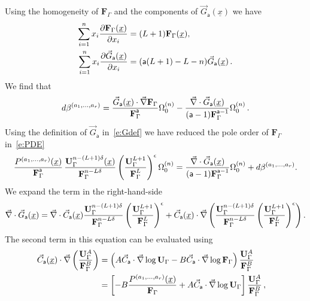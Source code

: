 \documentclass[a4paper,12pt]{article}
\numberwithin{equation}{section}
\numberwithin{figure}{section}
\begin{document}
Using the homogeneity of $\mathbf{F}_\Gamma$ and the
components of $\vec G_{\mathsf{a}}(\underline x)$ we have
\begin{align}
  \sum_{i=1}^n x_i {\partial\mathbf{F}_\Gamma (\underline x)\over \partial x_i}&=
                                                                  (L+1) \mathbf{F}_\Gamma (\underline x),\\
   \sum_{i=1}^n x_i {\partial\vec G_{\mathsf{a}}(\underline x)\over \partial x_i}&=
                                                                  (\mathsf{a}(L+1)-L-n) \vec G_{\mathsf{a}}(\underline x) \,.
\end{align}
We find that 
   \begin{equation}
     d\beta^{(a_1,\dots,a_r)}= {  \vec  G_{\mathsf{a}}
     (\underline x)
\cdot    \vec \nabla\textbf{F}_\Gamma\over
     \textbf{F}_\Gamma^{\mathsf{a}}}\Omega_0^{(n)}-{
\vec\nabla \cdot \vec G_{\mathsf{a}}
     (\underline x)
    \over
    (\mathsf{a}-1)\textbf{F}_\Gamma^{\mathsf{a}-1}}
  \Omega_0^{(n)} \,.
\end{equation}
Using the definition of $\vec  G_{\mathsf{a}}$ in~\eqref{e:Gdef} we
have reduced the pole order  of $ \textbf{F}_\Gamma$ in~\eqref{e:PDE} 
\begin{equation}
  {  P^{(a_1,\dots,a_r)}(\underline x)\over \textbf{F}_\Gamma^{\mathsf{a}}}\, { \textbf{U}_\Gamma^{n-(L+1)\delta} (\underline x)\over \textbf{F}_\Gamma^{n-L\delta}}
  \left(\textbf{U}_\Gamma^{L+1}\over \textbf{F}_\Gamma^L\right)^{\epsilon} \Omega^{(n)}_0={
\vec\nabla \cdot \vec G_{\mathsf{a}}
     (\underline x)
    \over
    (\mathsf{a}-1)\textbf{F}_\Gamma^{\mathsf{a}-1}}
  \Omega_0^{(n)}+d\beta^{(a_1,\dots,a_r)}.
\end{equation}
We expand the term in the right-hand-side
\begin{multline}
  \vec\nabla \cdot \vec G_{\mathsf{a}}(\underline x)=  \vec\nabla \cdot \vec C_{\mathsf{a}}(\underline x) {\textbf{U}_\Gamma^{n-(L+1)\delta}\over
  \textbf{F}_\Gamma^{n-L\delta}} \left(\mathbf{U}_\Gamma^{L+1}\over
  \mathbf{F}_\Gamma^L\right)^\epsilon
+
  \vec C_{\mathsf{a}}(\underline x) \cdot\vec\nabla  \left(  {\textbf{U}_\Gamma^{n-(L+1)\delta}\over
  \textbf{F}_\Gamma^{n-L\delta}} \left(\mathbf{U}_\Gamma^{L+1}\over
  \mathbf{F}_\Gamma^L\right)^\epsilon\right) .
\end{multline}
%
The second term in this equation can be evaluated using
\begin{align}
  \vec C_{\mathsf{a}}(\underline x)\cdot \vec\nabla \left(\mathbf{U}_\Gamma^{A}\over
\mathbf{F}_\Gamma^B\right)&=\left(A \vec
C_{\mathsf{a}}\cdot \vec\nabla \log\mathbf{U}_\Gamma -B \vec
C_{\mathsf{a}}\cdot \vec\nabla \log \mathbf{F}_\Gamma\right) {\mathbf{U}_\Gamma^{A}\over
\mathbf{F}_\Gamma^B} \cr
&=\left[-B{
    P^{(a_1,\dots,a_r)}(\underline x)\over
  \mathbf{F}_\Gamma}   
+
 A \vec
C_{\mathsf{a}}\cdot \vec\nabla \log\mathbf{U}_\Gamma \right] {\mathbf{U}_\Gamma^{A}\over
	\mathbf{F}_\Gamma^B}\,,
\end{align}
\end{document}
